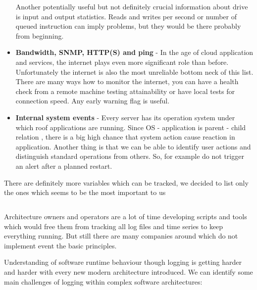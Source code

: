\begin{itemize}
    Another potentially useful but not definitely crucial information about drive is input and output statistics. Reads and writes per second or number of queued instruction can imply problems, but they would be there probably from beginning.  
    
    \item \textbf{Bandwidth, SNMP, HTTP(S) and ping} - In the age of cloud application and services, the internet plays even more significant role than before. Unfortunately\ms{,} the internet is also the most unreliable bottom neck  of this list. There are many ways how to monitor the internet, you can have a health check from a remote machine testing attainability or have local tests for connection speed. Any early warning flag is useful.  
    
    \item \textbf{Internal system events} - Every server has its operation system under which roof applications are running. Since OS - application is parent - child relation , there is a big high chance that system action cause reaction in application. Another thing is that we can be able to identify user actions and distinguish standard operations from others.  So, for example do not trigger an alert after a planned restart.
\end{itemize}

There are definitely more variables which can be tracked, we decided to list only the ones which seems to be the most important to us
\subsection{}

Architecture owners and operators are  a lot of time developing scripts and tools which would free them from tracking all log files and time series to keep everything running. But still\ms{,} there are many companies around which do not implement event the basic principles.

Understanding of software runtime behaviour though logging is getting harder and harder with every new modern architecture introduced. We can identify some main challenges of logging within complex software architectures:

